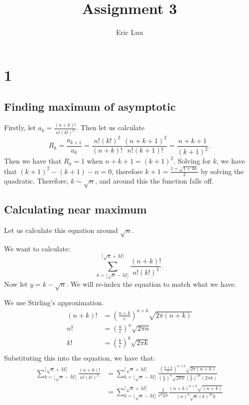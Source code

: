 \documentclass[]{article}
\title{Assignment 3}
\author{Eric Luu}
\begin{document}
\maketitle
\section{1}
\subsection{Finding maximum of asymptotic}
Firstly, let $a_k = \frac{(n + k)!}{n!(k!)^2}$. Then let us calculate 
\begin{equation}
	R_k = \frac{a_{k + 1}}{a_k} = \frac{n!(k!)^2}{(n + k)!}\frac{(n + k + 1)^2}{n! (k + 1)!} = \frac{n + k + 1}{(k + 1)^2}. 
\end{equation}
Then we have that $R_k = 1$ when $n + k + 1 = (k + 1)^2$. Solving for $k$, we have that $(k + 1)^2 - (k + 1) - n = 0$, therefore $k + 1 = \frac{1 + \sqrt{1 + 4n}}{2}$ by solving the quadratic. Therefore, $k \sim \sqrt{n}$, and around this the function falls off. 
\subsection{Calculating near maximum}
Let us calculate this equation around $\sqrt{n}$. 

We want to calculate:
\begin{equation}
	\sum_{k = \lfloor \sqrt{n} - M \rfloor }^{ \lceil \sqrt{n} + M \rceil}  \frac{(n + k)!}{n!(k!)^2}.
\end{equation}
Now let $y = k - \sqrt{n}$. We will re-index the equation to match what we have.

We use Stirling's approximation.
\begin{align*}
	(n + k)! &= \left(\frac{n + k}{e}\right)^{n + k}\sqrt{2\pi (n + k)}\\
	n! &= \left(\frac{n}{e}\right)^n \sqrt{2 \pi n}\\
	k! &= \left(\frac{k}{e}\right)^k \sqrt{2 \pi k}\\
\end{align*}
Substituting this into the equation, we have that:
\begin{align*}
	\sum_{k = \lfloor \sqrt{n} - M \rfloor }^{ \lceil \sqrt{n} + M \rceil}  \frac{(n + k)!}{n!(k!)^2}
	&=
	\sum_{k = \lfloor \sqrt{n} - M \rfloor }^{ \lceil \sqrt{n} + M \rceil} \frac{\left(\frac{n + k}{e}\right)^{n + k}\sqrt{2\pi (n + k)}}{\left(\frac{n}{e}\right)^n \sqrt{2 \pi n} \left(\frac{k}{e}\right)^{2k} (2 \pi k)}\\
	&=
	\sum_{k = \lfloor \sqrt{n} - M \rfloor }^{ \lceil \sqrt{n} + M \rceil} \frac{1}{e^k 2\pi} \frac{\left(n + k\right)^{n + k}\sqrt{(n + k)}}{\left(n\right)^n \sqrt{n} \left(k\right)^{2k}k }\\
\end{align*}
\end{document}
